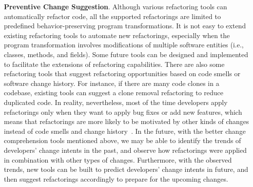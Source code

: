 
\textbf{Preventive Change Suggestion}.
Although various refactoring tools can automatically refactor code, all the supported refactorings are limited to predefined behavior-preserving program transformations. It is not easy to extend existing refactoring tools to automate new refactorings, especially when the program transformation involves modifications of multiple software entities (i.e., classes, methods, and fields). Some future tools can be designed and implemented to facilitate the extensions of refactoring capabilities.
There are also some refactoring tools that suggest refactoring opportunities based on code smells or software change history. For instance, if there are many code clones in a codebase, existing tools can suggest a clone removal refactoring to reduce duplicated code. In reality, nevertheless, most of the time developers apply refactorings only when they want to apply bug fixes or add new features, which means that refactorings are more likely to be motivated by other kinds of changes instead of code smells and change history~\cite{Silva2016:WWR}. In the future, with the better change comprehension tools mentioned above, we may be able to identify the trends of developers' change intents in the past, and observe how refactorings were applied in combination with other types of changes. Furthermore, with the observed trends, new tools can be built to predict developers' change intents in future, and then suggest refactorings accordingly to prepare for the upcoming changes.





